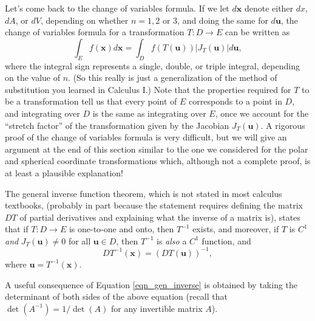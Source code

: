 Let's come back to the change of variables formula. If we let $d\mathbf{x}$ denote either $dx$, $dA$, or $dV$, depending on whether $n=1,2$ or 3, and doing the same for  $d\mathbf{u}$, the change of variables formula for a transformation $T:D\to E$ can be written as
\[
\int_E f(\mathbf{x})d\mathbf{x} = \int_D f(T(\mathbf{u}))\lvert J_T(\mathbf{u})\rvert d\mathbf{u},
\]
where the integral sign represents a single, double, or triple integral, depending on the value of $n$. (So this really is just a generalization of the method of substitution you learned in Calculus I.) Note that the properties required for $T$ to be a transformation tell us that every point of $E$ corresponds to a point in $D$, and integrating over $D$ is the same as integrating over $E$, once we account for the ``stretch factor'' of the transformation given by the Jacobian $J_T(\mathbf{u})$. A rigorous proof of the change of variables formula is very difficult, but we will give an argument at the end of this section similar to the one we considered for the polar and spherical coordinate transformations which, although not a complete proof, is at least a plausible explanation!

The general inverse function theorem, which is not stated in most calculus textbooks, (probably in part because the statement requires defining the matrix $DT$ of partial derivatives and explaining what the inverse of a matrix is), states that if $T:D\to E$ is one-to-one and onto, then $T^{-1}$ exists, and moreover, if $T$ is $C^1$ {\em and} $J_T(\mathbf{u})\neq 0$ for all $\mathbf{u}\in D$, then $T^{-1}$ is {\em also} a $C^1$ function, and
\begin{equation}\label{eqn_gen_inverse}
DT^{-1}(\mathbf{x}) = (DT(\mathbf{u}))^{-1},
\end{equation}
where $\mathbf{u}=T^{-1}(\mathbf{x})$. 


A useful consequence of Equation \eqref{eqn_gen_inverse} is obtained by taking the determinant of both sides of the above equation (recall that $\det(A^{-1}) = 1/\det(A)$ for any invertible matrix $A$).\\

